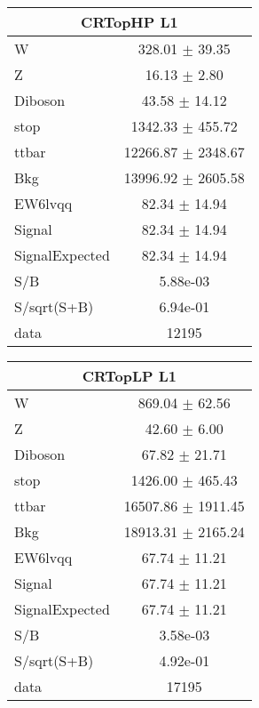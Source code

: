 \begin{table}
\centering
\begin{tabular}{|l|c|}
\hline
\multicolumn{2}{|c|}{CRTopHP L1}\\ \hline
W & 328.01 $\pm$ 39.35\\
Z & 16.13 $\pm$ 2.80\\
Diboson & 43.58 $\pm$ 14.12\\
stop & 1342.33 $\pm$ 455.72\\
ttbar & 12266.87 $\pm$ 2348.67\\
\hline
Bkg & 13996.92 $\pm$ 2605.58\\
\hline
EW6lvqq & 82.34 $\pm$ 14.94\\
\hline
Signal & 82.34 $\pm$ 14.94\\
SignalExpected & 82.34 $\pm$ 14.94\\
\hline
S/B & 5.88e-03\\
S/sqrt(S+B) & 6.94e-01\\
\hline
data & 12195\\ \hline
\end{tabular}
\begin{tabular}{|l|c|}
\hline
\multicolumn{2}{|c|}{CRTopLP L1}\\ \hline
W & 869.04 $\pm$ 62.56\\
Z & 42.60 $\pm$ 6.00\\
Diboson & 67.82 $\pm$ 21.71\\
stop & 1426.00 $\pm$ 465.43\\
ttbar & 16507.86 $\pm$ 1911.45\\
\hline
Bkg & 18913.31 $\pm$ 2165.24\\
\hline
EW6lvqq & 67.74 $\pm$ 11.21\\
\hline
Signal & 67.74 $\pm$ 11.21\\
SignalExpected & 67.74 $\pm$ 11.21\\
\hline
S/B & 3.58e-03\\
S/sqrt(S+B) & 4.92e-01\\
\hline
data & 17195\\ \hline
\end{tabular}

\end{table}
